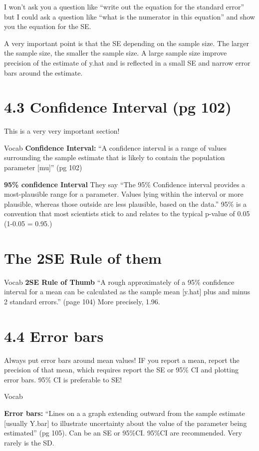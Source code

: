 \documentclass[]{book}
\theoremstyle{definition}
\theoremstyle{definition}
\theoremstyle{definition}
\theoremstyle{remark}
\begin{document}
I won't ask you a question like ``write out the equation for the
standard error'' but I could ask a question like ``what is the numerator
in this equation'' and show you the equation for the SE.

A very important point is that the SE depending on the sample size. The
larger the sample size, the smaller the sample size. A large sample size
improve precision of the estimate of y.hat and is reflected in a small
SE and narrow error bars around the estimate.

\section{4.3 Confidence Interval (pg
102)}\label{confidence-interval-pg-102}

This is a very very important section!

Vocab \textbf{Confidence Interval:} ``A confidence interval is a range
of values surrounding the sample estimate that is likely to contain the
population parameter {[}mu{]}'' (pg 102)

\textbf{95\% confidence Interval} They say ``The 95\% Confidence
interval provides a most-plausible range for a parameter. Values lying
within the interval or more plausible, whereas those outside are less
plausible, based on the data.'' 95\% is a convention that most
scientists stick to and relates to the typical p-value of 0.05 (1-0.05 =
0.95.)

\section{The 2SE Rule of them}\label{the-2se-rule-of-them}

Vocab \textbf{2SE Rule of Thumb} ``A rough approximately of a 95\%
confidence interval for a mean can be calculated as the sample mean
{[}y.hat{]} plus and minus 2 standard errors.'' (page 104) More
precisely, 1.96.

\section{4.4 Error bars}\label{error-bars}

Always put error bars around mean values! IF you report a mean, report
the precision of that mean, which requires report the SE or 95\% CI and
plotting error bars. 95\% CI is preferable to SE!

Vocab

\textbf{Error bars:} ``Lines on a a graph extending outward from the
sample estimate {[}usually Y.bar{]} to illustrate uncertainty about the
value of the parameter being estimated'' (pg 105). Can be an SE or
95\%CI. 95\%CI are recommended. Very rarely is the SD.
\end{document}

